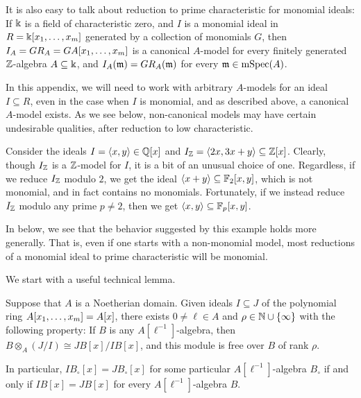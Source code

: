 \documentclass{amsart}
\begin{document}
It is also easy to talk about reduction to prime characteristic for monomial ideals:
If $\Bbbk$ is a field of characteristic zero, and $I$ is a monomial ideal in $R=\Bbbk[x_1, \ldots, x_m]$ generated by a collection of monomials $G$, then $I_A = GR_A = GA[x_1, \ldots, x_m]$ is a canonical $A$-model for every finitely generated $\mathbb{Z}$-algebra $A \subseteq \Bbbk$, and $I_A(\mathfrak{m}) = GR_A(\mathfrak{m})$ for every $\mathfrak{m} \in \operatorname{mSpec}(A)$.

In this appendix, we will need to work with arbitrary $A$-models for an ideal $I \subseteq R$, even in the case when $I$ is monomial, and as described above, a canonical $A$-model exists.  As we see below, non-canonical models may have certain undesirable qualities, after reduction to low characteristic.

Consider the ideals $I=\langle x, y \rangle \in \mathbb{Q}[x]$ and $I_{\mathbb{Z}} = \langle 2x, 3x+y \rangle \subseteq \mathbb{Z}[x]$.  Clearly, though $I_{\mathbb{Z}}$ is a $\mathbb{Z}$-model for $I$, it is a bit of an unusual choice of one.
Regardless, if we reduce $I_{\mathbb{Z}}$ modulo $2$, we get the ideal $\langle x+y \rangle \subseteq \mathbb{F}_2[x,y]$, which is not monomial, and in fact contains no monomials.  Fortunately, if we instead reduce $I_{\mathbb{Z}}$ modulo any prime $p \neq 2$, then we get $\langle x, y \rangle \subseteq \mathbb{F}_p[x,y]$.

In  below, we see that the behavior suggested by this example holds more generally.  That is, even if one starts with a non-monomial model, most reductions of a monomial ideal to prime characteristic will be monomial.

We start with a useful technical lemma.

\begin{lemma}
   \label{comparing expansions:  L}
   Suppose that $A$ is a Noetherian domain.
   Given ideals $I \subseteq J$ of the polynomial ring $A[x_1, \ldots, x_m] = A[x]$, there exists $0 \neq \ell \in A$ and $\rho \in \mathbb{N} \cup \{ \infty \}$ with the following property\textup:
   If $B$ is any $A[\ell^{-1}]$-algebra, then $B \otimes_A (J/I) \cong JB[x]/IB[x]$, and this module is free over $B$ of rank $\rho$.

   In particular, $IB_{\circ}[x]=JB_{\circ}[x]$ for some particular $A[\ell^{-1}]$-algebra $B_{\circ}$ if and only if $IB[x]=JB[x]$ for every $A[\ell^{-1}]$-algebra $B$.
\end{lemma}
\end{document}
